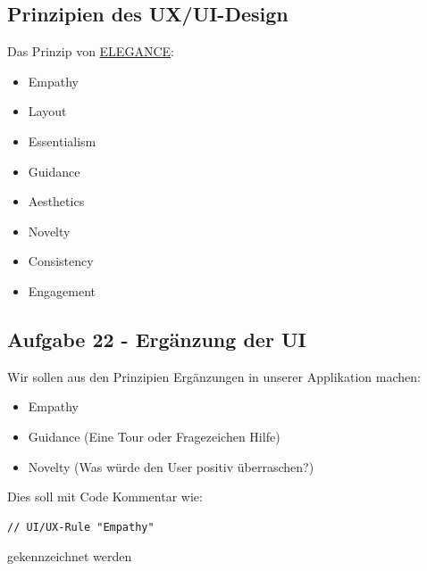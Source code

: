 \documentclass[a4paper]{article}
\begin{document}
\subsection{Prinzipien des UX/UI-Design}

Das Prinzip von \href{https://uxplanet.org/30-practical-tips-for-effective-user-interface-design-59e1e46ac370}{ELEGANCE}:

\begin{itemize}
    \item Empathy
    \item Layout
    \item Essentialism
    \item Guidance
    \item Aesthetics
    \item Novelty
    \item Consistency
    \item Engagement
\end{itemize}

\subsection{Aufgabe 22 - Ergänzung der UI}

Wir sollen aus den Prinzipien Ergänzungen in unserer Applikation machen:

\begin{itemize}
    \item Empathy
    \item Guidance (Eine Tour oder Fragezeichen Hilfe)
    \item Novelty (Was würde den User positiv überraschen?)
\end{itemize}

Dies soll mit Code Kommentar wie:

\begin{lstlisting}
// UI/UX-Rule "Empathy"
\end{lstlisting}

gekennzeichnet werden
\end{document}
